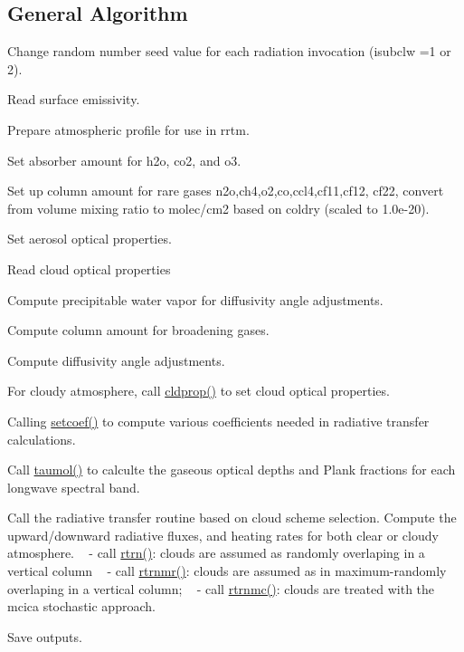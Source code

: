 \hypertarget{group__module__radlw__main_gen_lwrad}{}\subsection{General Algorithm}\label{group__module__radlw__main_gen_lwrad}

\begin{DoxyEnumerate}
\item Change random number seed value for each radiation invocation (isubclw =1 or 2).
\item Read surface emissivity.
\item Prepare atmospheric profile for use in rrtm.
\item Set absorber amount for h2o, co2, and o3.
\item Set up column amount for rare gases n2o,ch4,o2,co,ccl4,cf11,cf12, cf22, convert from volume mixing ratio to molec/cm2 based on coldry (scaled to 1.\+0e-\/20).
\item Set aerosol optical properties.
\item Read cloud optical properties
\item Compute precipitable water vapor for diffusivity angle adjustments.
\item Compute column amount for broadening gases.
\item Compute diffusivity angle adjustments.
\item For cloudy atmosphere, call \hyperlink{group__module__radlw__main_ga6bfdea656cc7e1f773ffcc797e072e91}{cldprop()} to set cloud optical properties.
\item Calling \hyperlink{group__module__radlw__main_gaeb7b74288cf87988c14bf6e24a2039ae}{setcoef()} to compute various coefficients needed in radiative transfer calculations.
\item Call \hyperlink{group__module__radlw__main_gab09f986fb87e796a30c889086c92aeb1}{taumol()} to calculte the gaseous optical depths and Plank fractions for each longwave spectral band.
\item Call the radiative transfer routine based on cloud scheme selection. Compute the upward/downward radiative fluxes, and heating rates for both clear or cloudy atmosphere. ~\newline
 -\/ call \hyperlink{group__module__radlw__main_gab002119955eb2b82f16352459180f5ed}{rtrn()}\+: clouds are assumed as randomly overlaping in a vertical column ~\newline
 -\/ call \hyperlink{group__module__radlw__main_ga8d4a6fecb4ad25468e91661a79d4ca20}{rtrnmr()}\+: clouds are assumed as in maximum-\/randomly overlaping in a vertical column; ~\newline
 -\/ call \hyperlink{group__module__radlw__main_ga1445abd529b76abe7ffb80e843d9fafc}{rtrnmc()}\+: clouds are treated with the mcica stochastic approach.
\item Save outputs. 
\end{DoxyEnumerate}

